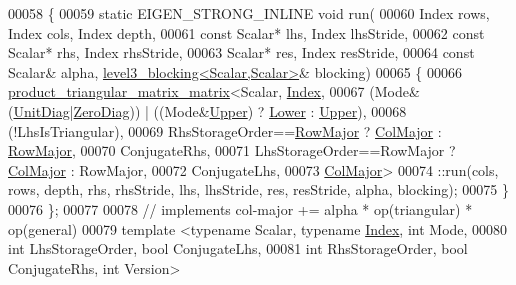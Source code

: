 \begin{DoxyCode}
00058 \{
00059   \textcolor{keyword}{static} EIGEN\_STRONG\_INLINE \textcolor{keywordtype}{void} run(
00060     Index rows, Index cols, Index depth,
00061     \textcolor{keyword}{const} Scalar* lhs, Index lhsStride,
00062     \textcolor{keyword}{const} Scalar* rhs, Index rhsStride,
00063     Scalar* res,       Index resStride,
00064     \textcolor{keyword}{const} Scalar& alpha, \hyperlink{class_eigen_1_1internal_1_1level3__blocking}{level3\_blocking<Scalar,Scalar>}& blocking)
00065   \{
00066     \hyperlink{struct_eigen_1_1internal_1_1product__triangular__matrix__matrix}{product\_triangular\_matrix\_matrix}<Scalar, 
      \hyperlink{namespace_eigen_a62e77e0933482dafde8fe197d9a2cfde}{Index},
00067       (Mode&(\hyperlink{group__enums_gga39e3366ff5554d731e7dc8bb642f83cdaddb72f888ac85d5a1c52333e54f9374b}{UnitDiag}|\hyperlink{group__enums_gga39e3366ff5554d731e7dc8bb642f83cda884ff7240392e85aa6e4b3c957e36483}{ZeroDiag})) | ((Mode&\hyperlink{group__enums_gga39e3366ff5554d731e7dc8bb642f83cda6bcb58be3b8b8ec84859ce0c5ac0aaec}{Upper}) ? \hyperlink{group__enums_gga39e3366ff5554d731e7dc8bb642f83cda891792b8ed394f7607ab16dd716f60e6}{Lower} : 
      \hyperlink{group__enums_gga39e3366ff5554d731e7dc8bb642f83cda6bcb58be3b8b8ec84859ce0c5ac0aaec}{Upper}),
00068       (!LhsIsTriangular),
00069       RhsStorageOrder==\hyperlink{group__enums_ggaacded1a18ae58b0f554751f6cdf9eb13acfcde9cd8677c5f7caf6bd603666aae3}{RowMajor} ? \hyperlink{group__enums_ggaacded1a18ae58b0f554751f6cdf9eb13a0cbd4bdd0abcfc0224c5fcb5e4f6669a}{ColMajor} : \hyperlink{group__enums_ggaacded1a18ae58b0f554751f6cdf9eb13acfcde9cd8677c5f7caf6bd603666aae3}{RowMajor},
00070       ConjugateRhs,
00071       LhsStorageOrder==RowMajor ? \hyperlink{group__enums_ggaacded1a18ae58b0f554751f6cdf9eb13a0cbd4bdd0abcfc0224c5fcb5e4f6669a}{ColMajor} : RowMajor,
00072       ConjugateLhs,
00073       \hyperlink{group__enums_ggaacded1a18ae58b0f554751f6cdf9eb13a0cbd4bdd0abcfc0224c5fcb5e4f6669a}{ColMajor}>
00074       ::run(cols, rows, depth, rhs, rhsStride, lhs, lhsStride, res, resStride, alpha, blocking);
00075   \}
00076 \};
00077 
00078 \textcolor{comment}{// implements col-major += alpha * op(triangular) * op(general)}
00079 \textcolor{keyword}{template} <\textcolor{keyword}{typename} Scalar, \textcolor{keyword}{typename} \hyperlink{namespace_eigen_a62e77e0933482dafde8fe197d9a2cfde}{Index}, \textcolor{keywordtype}{int} Mode,
00080           \textcolor{keywordtype}{int} LhsStorageOrder, \textcolor{keywordtype}{bool} ConjugateLhs,
00081           \textcolor{keywordtype}{int} RhsStorageOrder, \textcolor{keywordtype}{bool} ConjugateRhs, \textcolor{keywordtype}{int} Version>

\end{DoxyCode}
